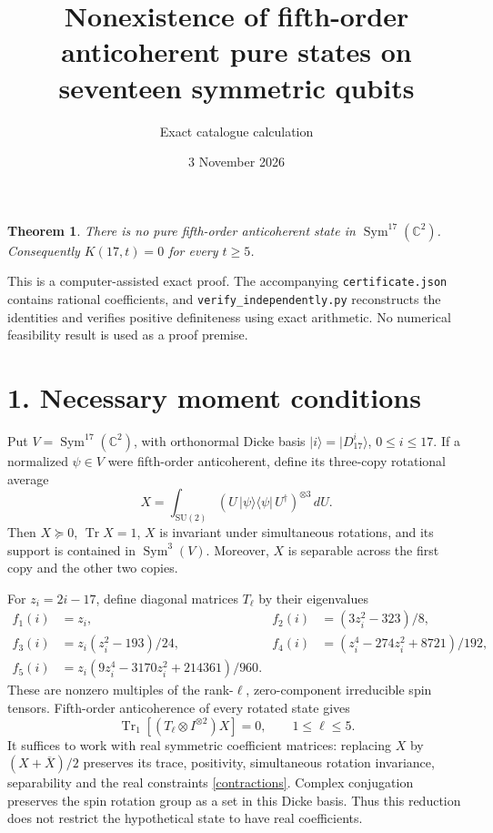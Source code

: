 \documentclass[11pt]{article}
\newtheorem{theorem}{Theorem}
\newcommand{\Tr}{\operatorname{Tr}}
\begin{document}
\title{Nonexistence of fifth-order anticoherent pure states on seventeen symmetric qubits}
\author{Exact catalogue calculation}
\date{3 November 2026}
\maketitle
\begin{theorem}
There is no pure fifth-order anticoherent state in
$\operatorname{Sym}^{17}(\mathbb C^2)$. Consequently
$K(17,t)=0$ for every $t\geq5$.
\end{theorem}
This is a computer-assisted exact proof. The accompanying
\texttt{certificate.json} contains rational coefficients, and
\texttt{verify\_independently.py} reconstructs the identities and verifies
positive definiteness using exact arithmetic. No numerical feasibility result
is used as a proof premise.

\section*{1. Necessary moment conditions}
Put $V=\operatorname{Sym}^{17}(\mathbb C^2)$, with orthonormal Dicke basis
$|i\rangle=|D_{17}^{i}\rangle$, $0\leq i\leq17$.
If a normalized $\psi\in V$ were fifth-order anticoherent, define its
three-copy rotational average
\[
 X=\int_{\mathrm{SU}(2)}
 (U\,|\psi\rangle\langle\psi|\,U^\dagger)^{\otimes3}\,dU.
\]
Then $X\succeq0$, $\Tr X=1$, $X$ is invariant under simultaneous rotations,
and its support is contained in $\operatorname{Sym}^{3}(V)$.
Moreover, $X$ is separable across the first copy and the other two copies.

For $z_i=2i-17$, define diagonal matrices $T_\ell$ by their eigenvalues
\begin{align*}
 f_1(i)&=z_i, &f_2(i)&=(3z_i^2-323)/8,\\
 f_3(i)&=z_i(z_i^2-193)/24, &f_4(i)&=(z_i^4-274z_i^2+8721)/192,\\
 f_5(i)&=z_i(9z_i^4-3170z_i^2+214361)/960.
\end{align*}
These are nonzero multiples of the rank-$\ell$, zero-component irreducible
spin tensors. Fifth-order anticoherence of every rotated state gives
\begin{equation}\label{contractions}
 \Tr_1[(T_\ell\otimes I^{\otimes2})X]=0,
 \qquad 1\leq\ell\leq5.
\end{equation}
It suffices to work with real symmetric coefficient matrices: replacing
$X$ by $(X+\overline X)/2$ preserves its trace, positivity, simultaneous
rotation invariance, separability and the real constraints
\eqref{contractions}. Complex conjugation preserves the spin rotation group
as a set in this Dicke basis. Thus this reduction does not restrict the
hypothetical state to have real coefficients.
\end{document}
